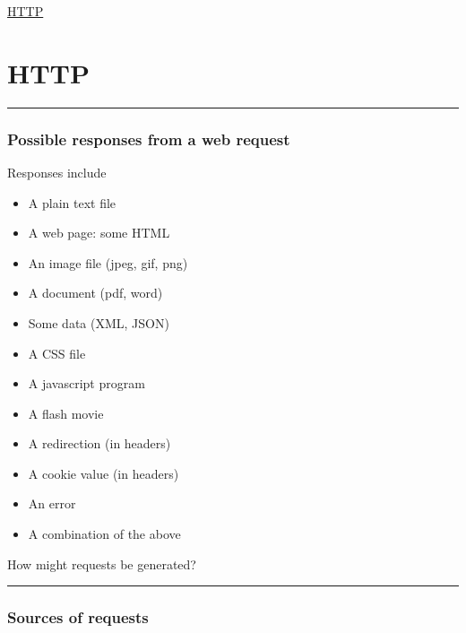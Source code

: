 \documentclass{article}[18pt]
\providecommand{\tightlist}{%
  \setlength{\itemsep}{0pt}\setlength{\parskip}{0pt}}
\begin{document}
\begin{center}
\underline{\huge HTTP}
\end{center}
\section{HTTP}

\begin{center}\rule{0.5\linewidth}{\linethickness}\end{center}

\hypertarget{possible-responses-from-a-web-request}{%
\subsubsection{Possible responses from a web
request}\label{possible-responses-from-a-web-request}}

Responses include

\begin{itemize}
\tightlist
\item
  A plain text file
\item
  A web page: some HTML
\item
  An image file (jpeg, gif, png)
\item
  A document (pdf, word)
\item
  Some data (XML, JSON)
\item
  A CSS file
\item
  A javascript program
\item
  A flash movie
\item
  A redirection (in headers)
\item
  A cookie value (in headers)
\item
  An error
\item
  A combination of the above
\end{itemize}

How might requests be generated?

\begin{center}\rule{0.5\linewidth}{\linethickness}\end{center}

\hypertarget{sources-of-requests}{%
\subsubsection{Sources of requests}\label{sources-of-requests}}
\end{document}

